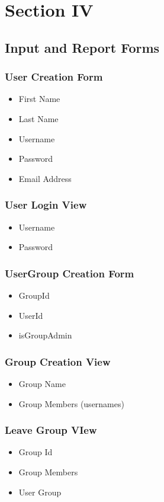 \documentclass[a4paper]{article}
\begin{document}
\section{Section IV}
\subsection{Input and Report Forms}

\subsubsection*{User Creation Form}
\begin{itemize}
\item First Name
\item Last Name
\item Username
\item Password
\item Email Address
\end{itemize}

\subsubsection*{User Login View}
\begin{itemize}
\item Username
\item Password
\end{itemize}

\subsubsection*{UserGroup Creation Form}
\begin{itemize}
\item GroupId
\item UserId
\item isGroupAdmin
\end{itemize}

\subsubsection*{Group Creation View}
\begin{itemize}
\item Group Name
\item Group Members (usernames)
\end{itemize}

\subsubsection*{Leave Group VIew}
\begin{itemize}
\item Group Id
\item Group Members
\item User Group
\end{itemize}
\end{document}
